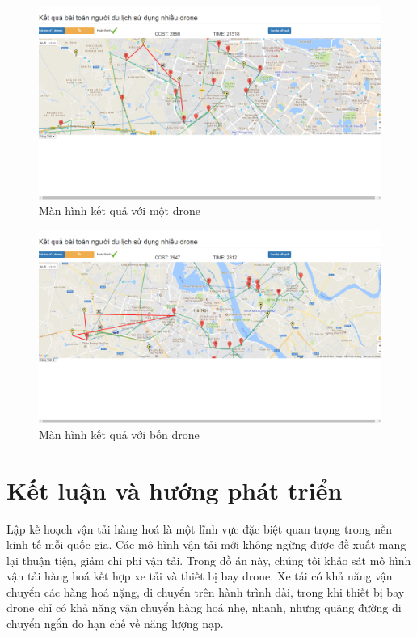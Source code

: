 \documentclass[a4paper,12pt]{report}
\begin{document}
\begin{figure}

\includegraphics[scale=0.41]{screen/solution1.png}
\caption{Màn hình kết quả với một drone}
\label{solution1}
\end{figure}
\begin{figure}

\includegraphics[scale=0.41]{screen/solution2.png}
\caption{Màn hình kết quả với bốn drone}
\label{solution2}
\end{figure}
\chapter*{Kết luận và hướng phát triển}
Lập kế hoạch vận tải hàng hoá là một lĩnh vực đặc biệt quan trọng trong nền kinh tế mỗi quốc gia. Các mô hình vận tải mới không ngừng được đề xuất mang lại thuận tiện, giảm chi phí vận tải. Trong đồ án này, chúng tôi khảo sát mô hình vận tải hàng hoá kết hợp xe tải và thiết bị bay drone. Xe tải có khả năng vận chuyển các hàng hoá nặng, di chuyển trên hành trình dài, trong khi thiết bị bay drone chỉ có khả năng vận chuyển hàng hoá nhẹ, nhanh, nhưng quãng đường di chuyển ngắn do hạn chế về năng lượng nạp. 
\end{document}
